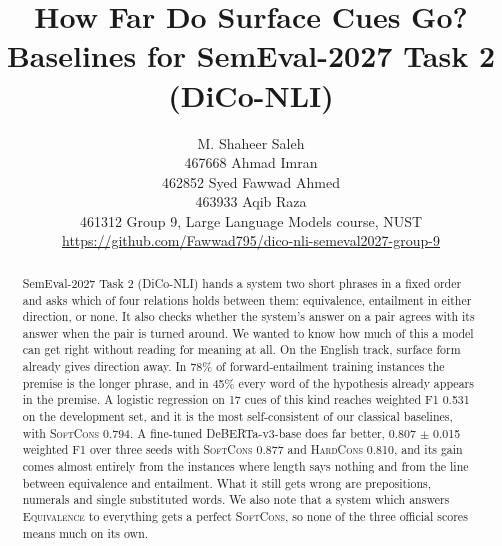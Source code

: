 \documentclass[11pt]{article}
\title{How Far Do Surface Cues Go?\\
Baselines for SemEval-2027 Task 2 (DiCo-NLI)}
\author{
  M. Shaheer Saleh \\ 467668 \And
  Ahmad Imran \\ 462852 \And
  Syed Fawwad Ahmed \\ 463933 \And
  Aqib Raza \\ 461312 \AND
  Group 9, Large Language Models course, NUST \\
  \url{https://github.com/Fawwad795/dico-nli-semeval2027-group-9}
}
\newcommand{\EQ}{\textsc{Equivalence}}
\newcommand{\SoftCons}{\textsc{SoftCons}}
\newcommand{\HardCons}{\textsc{HardCons}}
\begin{document}
\maketitle

\begin{abstract}
SemEval-2027 Task 2 (DiCo-NLI) hands a system two short phrases in a fixed order and asks which of four relations holds between them: equivalence, entailment in either direction, or none. It also checks whether the system's answer on a pair agrees with its answer when the pair is turned around. We wanted to know how much of this a model can get right without reading for meaning at all. On the English track, surface form already gives direction away. In 78\% of forward-entailment training instances the premise is the longer phrase, and in 45\% every word of the hypothesis already appears in the premise. A logistic regression on 17 cues of this kind reaches weighted F1 0.531 on the development set, and it is the most self-consistent of our classical baselines, with \SoftCons{} 0.794. A fine-tuned DeBERTa-v3-base does far better, 0.807 $\pm$ 0.015 weighted F1 over three seeds with \SoftCons{} 0.877 and \HardCons{} 0.810, and its gain comes almost entirely from the instances where length says nothing and from the line between equivalence and entailment. What it still gets wrong are prepositions, numerals and single substituted words. We also note that a system which answers \EQ{} to everything gets a perfect \SoftCons{}, so none of the three official scores means much on its own.
\end{abstract}
















\appendix

\end{document}
